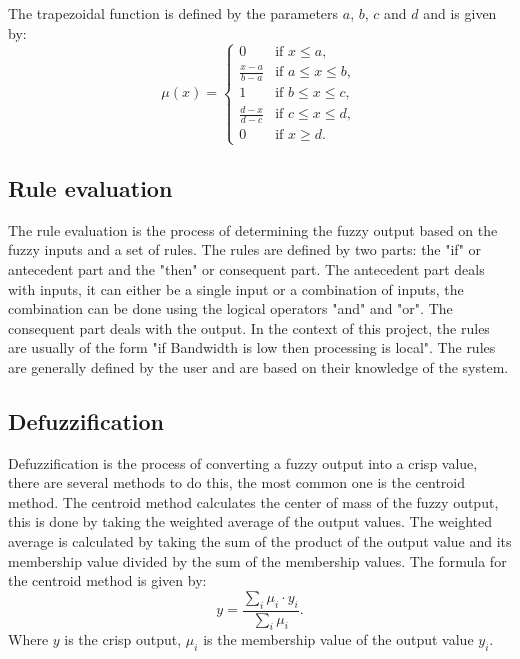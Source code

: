 The trapezoidal function is defined by the parameters $a$, $b$, $c$ and $d$ and is given by:
\begin{equation}
	\mu(x) = \begin{cases}
		0                   & \text{if } x \leq a,        \\
		\frac{x - a}{b - a} & \text{if } a \leq x \leq b, \\
		1                   & \text{if } b \leq x \leq c, \\
		\frac{d - x}{d - c} & \text{if } c \leq x \leq d, \\
		0                   & \text{if } x \geq d.
	\end{cases}
\end{equation}

\subsection*{Rule evaluation}

The rule evaluation is the process of determining the fuzzy output based on the fuzzy inputs and a set of rules. The rules are defined by two parts:
the "if" or antecedent part and the "then" or consequent part. The antecedent part deals with inputs, it can either be a single input or a combination
of inputs, the combination can be done using the logical operators "and" and "or". The consequent part deals with the output. In the context of this
project, the rules are usually of the form "if Bandwidth is low then processing is local". The rules are generally defined by the user and are based
on their knowledge of the system.

\subsection*{Defuzzification}

Defuzzification is the process of converting a fuzzy output into a crisp value, there are several methods to do this, the most common one is the
centroid method. The centroid method calculates the center of mass of the fuzzy output, this is done by taking the weighted average of the output
values. The weighted average is calculated by taking the sum of the product of the output value and its membership value divided by the sum of the
membership values. The formula for the centroid method is given by:
\begin{equation}
	y = \frac{\sum_{i} \mu_i \cdot y_i}{\sum_{i} \mu_i}.
\end{equation}
Where $y$ is the crisp output, $\mu_i$ is the membership value of the output value $y_i$.